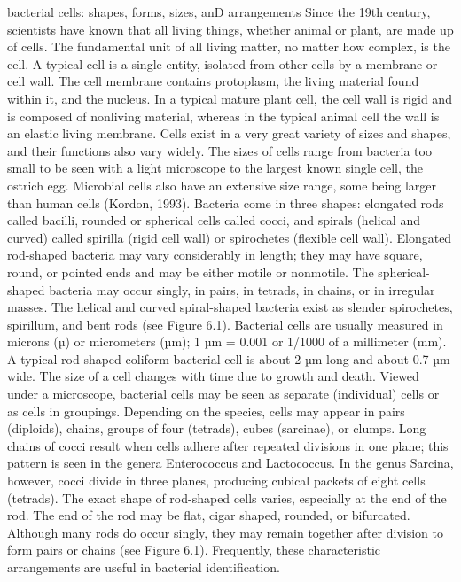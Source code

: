 \documentclass{article}
\begin{document}
bacterial cells: shapes, forms, sizes, anD arrangements Since the 19th
century, scientists have known that all living things, whether animal or
plant, are made up of cells. The fundamental unit of all living matter,
no matter how complex, is the cell. A typical cell is a single entity,
isolated from other cells by a membrane or cell wall. The cell membrane
contains protoplasm, the living material found within it, and the
nucleus. In a typical mature plant cell, the cell wall is rigid and is
composed of nonliving material, whereas in the typical animal cell the
wall is an elastic living membrane. Cells exist in a very great variety
of sizes and shapes, and their functions also vary widely. The sizes of
cells range from bacteria too small to be seen with a light microscope
to the largest known single cell, the ostrich egg. Microbial cells also
have an extensive size range, some being larger than human cells
(Kordon, 1993). Bacteria come in three shapes: elongated rods called
bacilli, rounded or spherical cells called cocci, and spirals (helical
and curved) called spirilla (rigid cell wall) or spirochetes (flexible
cell wall). Elongated rod-shaped bacteria may vary considerably in
length; they may have square, round, or pointed ends and may be either
motile or nonmotile. The spherical-shaped bacteria may occur singly, in
pairs, in tetrads, in chains, or in irregular masses. The helical and
curved spiral-shaped bacteria exist as slender spirochetes, spirillum,
and bent rods (see Figure 6.1). Bacterial cells are usually measured in
microns (µ) or micrometers (µm); 1 µm = 0.001 or 1/1000 of a millimeter
(mm). A typical rod-shaped coliform bacterial cell is about 2 µm long
and about 0.7 µm wide. The size of a cell changes with time due to
growth and death. Viewed under a microscope, bacterial cells may be seen
as separate (individual) cells or as cells in groupings. Depending on
the species, cells may appear in pairs (diploids), chains, groups of
four (tetrads), cubes (sarcinae), or clumps. Long chains of cocci result
when cells adhere after repeated divisions in one plane; this pattern is
seen in the genera Enterococcus and Lactococcus. In the genus Sarcina,
however, cocci divide in three planes, producing cubical packets of
eight cells (tetrads). The exact shape of rod-shaped cells varies,
especially at the end of the rod. The end of the rod may be flat, cigar
shaped, rounded, or bifurcated. Although many rods do occur singly, they
may remain together after division to form pairs or chains (see Figure
6.1). Frequently, these characteristic arrangements are useful in
bacterial identification.
\end{document}
